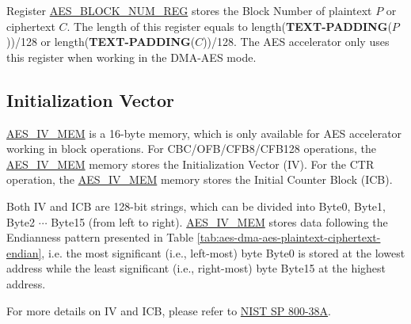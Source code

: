 \documentclass[main\_\_EN.tex]{subfiles}
\begin{document}
Register \hyperref[regdesc:AESBLOCKNUMREG]{AES\_BLOCK\_NUM\_REG} stores the Block Number of plaintext $P$ or ciphertext $C$. The length of this register equals to length({\bfseries TEXT-PADDING}($P$))/128 or length({\bfseries TEXT-PADDING}($C$))/128. The AES accelerator only uses this register when working in the DMA-AES mode.

\subsection{Initialization Vector}\label{sec:aes-init-vector}

\label{memdesc:AESIVMEM}\hyperref[memdesc:AESIVMEM]{AES\_IV\_MEM} is a 16-byte memory, which is only available for AES accelerator working in block operations. For CBC/OFB/CFB8/CFB128 operations, the \hyperref[memdesc:AESIVMEM]{AES\_IV\_MEM} memory stores the Initialization Vector (IV). For the CTR operation, the \hyperref[memdesc:AESIVMEM]{AES\_IV\_MEM} memory stores the Initial Counter Block (ICB). 

Both IV and ICB are 128-bit strings, which can be divided into Byte0, Byte1, Byte2 \begin{math}\cdots\end{math} Byte15 (from left to right). \hyperref[memdesc:AESIVMEM]{AES\_IV\_MEM} stores data following the Endianness pattern presented in Table \ref{tab:aes-dma-aes-plaintext-ciphertext-endian}, i.e. the most significant (i.e., left-most) byte Byte0 is stored at the lowest address while the least significant (i.e., right-most) byte Byte15 at the highest address. 

For more details on IV and ICB, please refer to \href{https://nvlpubs.nist.gov/nistpubs/Legacy/SP/nistspecialpublication800-38a.pdf}{NIST SP 800-38A}.
\end{document}
